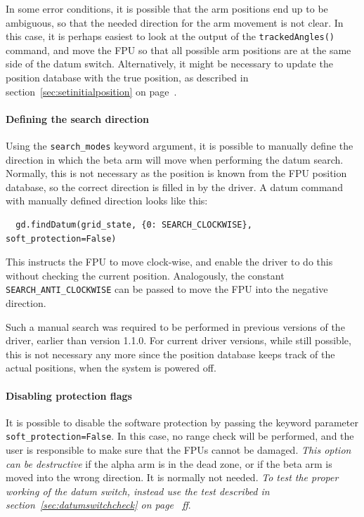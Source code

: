 \documentclass[11pt,a4paper]{scrartcl}
\begin{document}
 
In some error conditions, it is possible that the arm positions end up
to be ambiguous, so that the needed direction for the arm movement is
not clear. In this case, it is perhaps easiest to look at the output
of the \texttt{trackedAngles()} command, and move the FPU so that all
possible arm positions are at the same side of the datum switch.
Alternatively, it might be necessary to update the position database
with the true position, as described in
section~\ref{sec:setinitialposition} on
page~\pageref{sec:setinitialposition}.



\paragraph{Defining the search direction}
Using the \texttt{search\_modes} keyword argument, it is possible to
manually define the direction in which the beta arm will move when
performing the datum search.  Normally, this is not necessary as the
position is known from the FPU position database, so the correct
direction is filled in by the driver. A datum command with manually
defined direction looks like this:

\begin{verbatim}
  gd.findDatum(grid_state, {0: SEARCH_CLOCKWISE}, soft_protection=False)
\end{verbatim}

This instructs the FPU to move clock-wise, and enable the driver to do
this without checking the current position. Analogously, the constant
\texttt{SEARCH\_ANTI\_CLOCKWISE} can be passed to move the FPU into
the negative direction.

Such a manual search was required to be performed in previous versions
of the driver, earlier than version 1.1.0. For current driver
versions, while still possible, this is not necessary any more since
the position database keeps track of the actual positions, when the
system is powered off.  

\paragraph{Disabling protection flags}
It is possible to disable the software protection by passing the
keyword parameter \texttt{soft\_protection=False}.  In this case, no
range check will be performed, and the user is responsible to make
sure that the FPUs cannot be damaged. \emph{This option can be
  destructive} if the alpha arm is in the dead zone, or if the beta
arm is moved into the wrong direction. It is normally not
needed. \emph{To test the proper working of the datum switch, instead
  use the test described in section~\ref{sec:datumswitchcheck} on
  page~\pageref{sec:datumswitchcheck} ff}.
\end{document}

